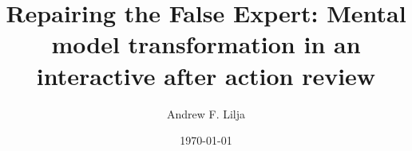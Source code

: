 \documentclass{book}
\begin{document}
\title{Repairing the False Expert: Mental model transformation in an interactive after action review}
\author{Andrew F. Lilja}
\date{\today}

\maketitle

\tableofcontents

\pagebreak





\end{document}
